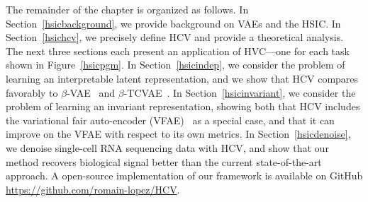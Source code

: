 The remainder of the chapter is organized as follows.
In Section~\ref{hsicbackground}, we provide background on VAEs and the HSIC.
In Section~\ref{hsichcv}, we precisely define HCV and provide a theoretical analysis.
The next three sections each present an application of HVC---one for each task shown in Figure~\ref{hsicpgm}.
In Section~\ref{hsicindep}, we consider the problem of learning an interpretable latent representation, and we show that HCV compares favorably to $\beta$-VAE~\cite{Higgins2017} and $\beta$-TCVAE~\cite{betatcVAE}.
In Section~\ref{hsicinvariant}, we consider the problem of learning an invariant representation, showing both that HCV includes the variational fair auto-encoder (VFAE)~\cite{VFAE} as a special case, and that it can improve on the VFAE with respect to its own metrics.
In Section~\ref{hsicdenoise}, we denoise single-cell RNA sequencing data with HCV, and show that our method recovers biological signal better than the current state-of-the-art approach. A open-source implementation of our framework is available on GitHub \url{https://github.com/romain-lopez/HCV}.
